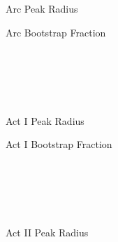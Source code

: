 \begin{figure*}
    \centering
    \hfill 
    \begin{subfigure}[t]{0.45\textwidth}
        \centering
		\begin{adjustbox}{width=\textwidth}
			\Large
			
		\end{adjustbox}
        \caption{Arc Peak Radius}
    \end{subfigure}
    \hfill
    \begin{subfigure}[t]{0.45\textwidth}
        \centering
		\begin{adjustbox}{width=\textwidth}
			\Large
			
		\end{adjustbox}
        \caption{Arc Bootstrap Fraction}
    \end{subfigure}
    \hfill \hfill ~\\ ~\\ ~\\ ~\\
    \hfill 
    \begin{subfigure}[t]{0.45\textwidth}
        \centering
		\begin{adjustbox}{width=\textwidth}
			\Large
			
		\end{adjustbox}
        \caption{Act I Peak Radius}
    \end{subfigure}
    \hfill
    \begin{subfigure}[t]{0.45\textwidth}
        \centering
		\begin{adjustbox}{width=\textwidth}
			\Large
			
		\end{adjustbox}
        \caption{Act I Bootstrap Fraction}
    \end{subfigure}
    \hfill \hfill ~\\ ~\\ ~\\ ~\\
    \hfill 
    \begin{subfigure}[t]{0.45\textwidth}
        \centering
		\begin{adjustbox}{width=\textwidth}
			\Large
			
		\end{adjustbox}
        \caption{Act II Peak Radius}
    \end{subfigure}
    \hfill
    \begin{subfigure}[t]{0.45\textwidth}
        \centering
		\begin{adjustbox}{width=\textwidth}

\end{adjustbox}
\end{subfigure}
\end{figure*}
